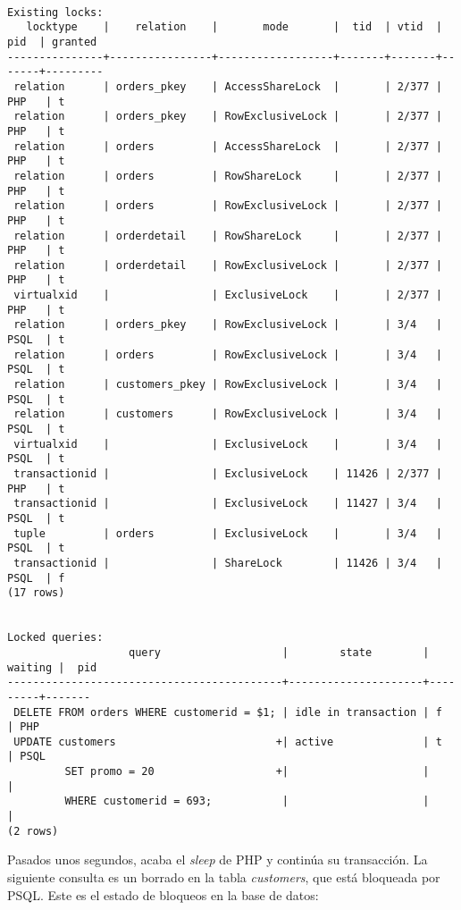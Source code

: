 \documentclass{article}
\begin{document}
\begin{Verbatim}[frame=lines]

Existing locks:
   locktype    |    relation    |       mode       |  tid  | vtid  |  pid  | granted
---------------+----------------+------------------+-------+-------+-------+---------
 relation      | orders_pkey    | AccessShareLock  |       | 2/377 | PHP   | t
 relation      | orders_pkey    | RowExclusiveLock |       | 2/377 | PHP   | t
 relation      | orders         | AccessShareLock  |       | 2/377 | PHP   | t
 relation      | orders         | RowShareLock     |       | 2/377 | PHP   | t
 relation      | orders         | RowExclusiveLock |       | 2/377 | PHP   | t
 relation      | orderdetail    | RowShareLock     |       | 2/377 | PHP   | t
 relation      | orderdetail    | RowExclusiveLock |       | 2/377 | PHP   | t
 virtualxid    |                | ExclusiveLock    |       | 2/377 | PHP   | t
 relation      | orders_pkey    | RowExclusiveLock |       | 3/4   | PSQL  | t
 relation      | orders         | RowExclusiveLock |       | 3/4   | PSQL  | t
 relation      | customers_pkey | RowExclusiveLock |       | 3/4   | PSQL  | t
 relation      | customers      | RowExclusiveLock |       | 3/4   | PSQL  | t
 virtualxid    |                | ExclusiveLock    |       | 3/4   | PSQL  | t
 transactionid |                | ExclusiveLock    | 11426 | 2/377 | PHP   | t
 transactionid |                | ExclusiveLock    | 11427 | 3/4   | PSQL  | t
 tuple         | orders         | ExclusiveLock    |       | 3/4   | PSQL  | t
 transactionid |                | ShareLock        | 11426 | 3/4   | PSQL  | f
(17 rows)


Locked queries:
                   query                   |        state        | waiting |  pid
-------------------------------------------+---------------------+---------+-------
 DELETE FROM orders WHERE customerid = $1; | idle in transaction | f       | PHP
 UPDATE customers                         +| active              | t       | PSQL
         SET promo = 20                   +|                     |         |
         WHERE customerid = 693;           |                     |         |
(2 rows)
\end{Verbatim}

Pasados unos segundos, acaba el \textit{sleep} de PHP y continúa su transacción. La siguiente consulta es un borrado en la tabla \textit{customers}, que está bloqueada por PSQL. Este es el estado de bloqueos en la base de datos:
\end{document}
